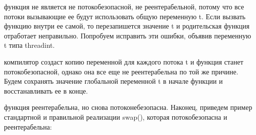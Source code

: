 {\begin{figure}[H]
	\end{figure}
	 функция не является не потокобезопасной, не реентерабельной, потому что все потоки вызывающие ее будут использовать общую переменную t. Если вызвать функцию внутри ее самой, то перезапишется значение t и родительская функция отработает неправильно. Попробуем исправить эти ошибки, объявив переменную t типа \textunderscore \textunderscore threadint.
	\begin{figure}[H]
		
	\end{figure}
	 компилятор создаст копию переменной для каждого потока t и функция станет потокобезопасной, однако она все еще не реентерабельна по той же причине. Будем сохранять значение глобальной переменной t в начале функции и восстанавливать ее в конце.
	\begin{figure}[H]
		
	\end{figure}
	 функция реентерабельна, но снова потоконебезопасна. Наконец, приведем пример стандартной и правильной реализации swap(), которая потокобезопасна и реентерабельна:
	\begin{figure}[H]
		
	\end{figure}
}